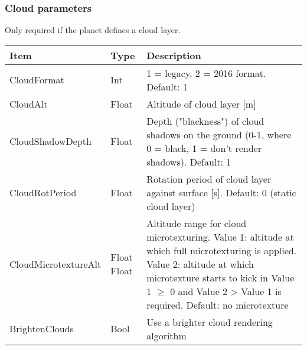 \documentclass[Orbiter Developer Manual.tex]{subfiles}
\begin{document}


\subsubsection*{Cloud parameters}
Only required if the planet defines a cloud layer.

	\begin{longtable}{ |p{}|p{}|p{}| }
	\hline\rule{0pt}{2ex}
	\textbf{Item} & \textbf{Type} & \textbf{Description}\\
	\hline\rule{0pt}{2ex}
	CloudFormat & Int & 1 = legacy, 2 = 2016 format. Default: 1\\
	\hline\rule{0pt}{2ex}
	CloudAlt & Float & Altitude of cloud layer [m]\\
	\hline\rule{0pt}{2ex}
	CloudShadowDepth & Float & Depth ("blackness") of cloud shadows on the ground (0-1, where 0 = black, 1 = don’t render shadows). Default: 1\\
	\hline\rule{0pt}{2ex}
	CloudRotPeriod & Float & Rotation period of cloud layer against surface [s]. Default: 0 (static cloud layer)\\
	\hline\rule{0pt}{2ex}
	CloudMicrotextureAlt & Float Float & Altitude range for cloud microtexturing.\newline
	Value 1: altitude at which full microtexturing is applied.\newline
	Value 2: altitude at which microtexture starts to kick in\newline
	Value 1 $\geq$ 0 and Value 2 > Value 1 is required. Default: no microtexture\\
	\hline\rule{0pt}{2ex}
	BrightenClouds & Bool & Use a brighter cloud rendering algorithm\\
	\hline
	\end{longtable}
\end{document}
